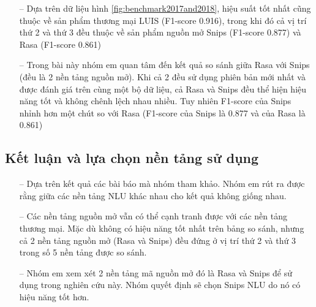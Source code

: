 \begin{itemize}
    \item[--] Dựa trên dữ liệu hình \ref{fig:benchmark2017and2018}, hiệu suất tốt nhất cũng thuộc về sản phẩm thương mại LUIS (F1-score 0.916), trong khi đó cả vị trí thứ 2 và thứ 3 đều thuộc về sản phẩm nguồn mở Snips (F1-score 0.877) và Rasa  (F1-score 0.861)
    \item[--] Trong bài này nhóm em quan tâm đến kết quả so sánh giữa Rasa với Snips (đều là 2 nền tảng nguồn mở). Khi cả 2 đều sử dụng phiên bản mới nhất và được đánh giá trên cùng một bộ dữ liệu, cả Rasa và Snips đều thể hiện hiệu năng tốt và không chênh lệch nhau nhiều. Tuy nhiên F1-score của Snips nhỉnh hơn một chút so với Rasa (F1-score của Snips là 0.877 và của Rasa là 0.861)
\end{itemize}

\subsection{Kết luận và lựa chọn nền tảng sử dụng}

\begin{itemize}
    \item[--] Dựa trên kết quả các bài báo mà nhóm tham khảo. Nhóm em rút ra được rằng giữa các nền tảng NLU khác nhau cho kết quả không giống nhau.
    \item[--] Các nền tảng nguồn mở vẫn có thể cạnh tranh được với các nền tảng thương mại. Mặc dù không có hiệu năng tốt nhất trên bảng so sánh, nhưng cả 2 nền tảng nguồn mở (Rasa và Snips) đều đứng ở vị trí thứ 2 và thứ 3 trong số 5 nền tảng được so sánh.
    \item[--] Nhóm em xem xét 2 nền tảng mã nguồn mở đó là Rasa và Snips để sử dụng trong nghiên cứu này. Nhóm quyết định sẽ chọn Snips NLU do nó có hiệu năng tốt hơn.
\end{itemize}